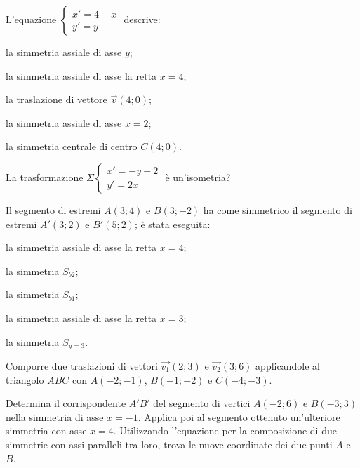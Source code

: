 \begin{esercizio}
  \label{ese:8.87} %
  L'equazione \(\begin{cases}x'=4-x\\y'=y\end{cases}\) descrive: 
  \begin{enumeratea}
    \item la simmetria assiale di asse \(y\);
    \item la simmetria assiale di asse la retta \(x=4\);
    \item la traslazione di vettore \(\vec{v}(4;0)\);
    \item la simmetria assiale di asse \(x=2\);
    \item la simmetria centrale di centro \(C(4;0)\).
  \end{enumeratea}
\end{esercizio}

\begin{esercizio}
  \label{ese:8.88} %
  La trasformazione \(\Sigma \begin{cases}x'=-y+2\\y'=2x\end{cases}\) è 
  un'isometria?
\end{esercizio}

\begin{esercizio}
  \label{ese:8.89} %
  Il segmento di estremi \(A(3;4)\) e \(B(3;-2)\) ha come simmetrico il 
  segmento di estremi \(A'(3;2)\) e \(B'(5;2)\); è stata eseguita:
  \begin{enumeratea}
    \item la simmetria assiale di asse la retta \(x=4\);
    \item la simmetria \(S_{b2}\);
    \item la simmetria \(S_{b1}\);
    \item la simmetria assiale di asse la retta \(x=3\);
    \item la simmetria \(S_{y=3}\).
  \end{enumeratea}
\end{esercizio}

\begin{esercizio}
  \label{ese:8.97} %
  Comporre due traslazioni di vettori \(\vec{v_1}(2;3)\) e 
  \(\vec{v_2}(3;6)\) applicandole al triangolo \(ABC\) con \(A(-2;-1)\), 
  \(B(-1;-2)\) e \(C(-4;-3)\).
\end{esercizio}

\begin{esercizio}
  \label{ese:8.98} %
  Determina il corrispondente \(A'B'\) del segmento di vertici \(A(-2;6)\) 
  e \(B(-3;3)\) nella simmetria di asse \(x=-1\). Applica poi al segmento 
  ottenuto un'ulteriore simmetria con asse \(x=4\). Utilizzando 
  l'equazione per la composizione di due simmetrie con assi paralleli 
  tra loro, trova le nuove coordinate dei due punti \(A\) e \(B\).
\end{esercizio}

